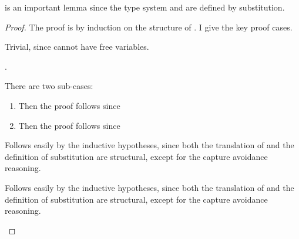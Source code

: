  is an important lemma since the type system and
 are defined by substitution.
\begin{lemma}[Compositionality]
  \label{lem:abs-cc:m:subst}
  \im{\absccmodel{(\subst{\te}{\tepr}{\tx})} = \subst{\absccmodel{\te}}{\absccmodel{\te}}{\sx}}
\end{lemma}
\begin{proof}
  The proof is by induction on the structure of \im{\te}.
  I give the key proof cases.
  \begin{proofcases}
  \item \im{\te = \tpropty}

    Trivial, since \im{\te = \tpropty} cannot have free variables.

  \item \im{\te = \txpr}.

    There are two sub-cases:
    \begin{enumerate}[label={\bfseries Sub-case:},itemindent=2.5em]
      \item \im{\txpr = \tx}
      Then the proof follows since \im{\absccmodel{(\subst{\tx}{\tepr}{\tx})} =
        \absccmodel{\tepr} = \subst{\sx}{\absccmodel{\te}}{\sx}}

      \item \im{\txpr \neq \tx}
      Then the proof follows since \im{\absccmodel{(\subst{\txpr}{\tepr}{\tx})} = \sxpr
        = \subst{\sxpr}{\absccmodel{\tepr}}{\sx}}
    \end{enumerate}

  \item \im{\te = \tlete{\tx}{\teone}{\tetwo}}

    Follows easily by the inductive hypotheses, since both the translation of
     and the definition of substitution are structural, except
    for the capture avoidance reasoning.

  \item \im{\te = \tpity{\tx}{\tA}{\tB}}

    Follows easily by the inductive hypotheses, since both the translation of
    \im{\tfontsym{\Pi}} and the definition of substitution are structural,
    except for the capture avoidance reasoning.

  \item \im{\te = \tcloe{\teone}{\tetwo}}


\end{proofcases}
\end{proof}
